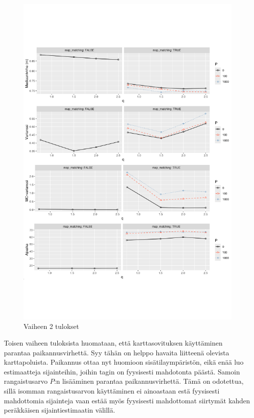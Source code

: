 \documentclass[
  12pt,
  a4paper, twoside]{book}
\begin{document}
\begin{figure}[H]
\centering
\includegraphics[width=15cm]{phase2_results_vertical_safe}
\caption{Vaiheen 2 tulokset}
\label{fig:phase2_results}
\end{figure}

Toisen vaiheen tuloksista huomataan, että karttasovituksen käyttäminen parantaa paikannusvirhettä. Syy tähän on helppo havaita liitteenä olevista karttapoluista. Paikannus ottaa nyt huomioon sisätilaympäristön, eikä enää luo estimaatteja sijainteihin, joihin tagin on fyysisesti mahdotonta päästä. Samoin rangaistusarvo \(P\):n lisääminen parantaa paikannusvirhettä. Tämä on odotettua, sillä isomman rangaistusarvon käyttäminen ei ainoastaan estä fyysisesti mahdottomia sijainteja vaan estää myös fyysisesti mahdottomat siirtymät kahden peräkkäisen sijaintiestimaatin välillä.
\end{document}
